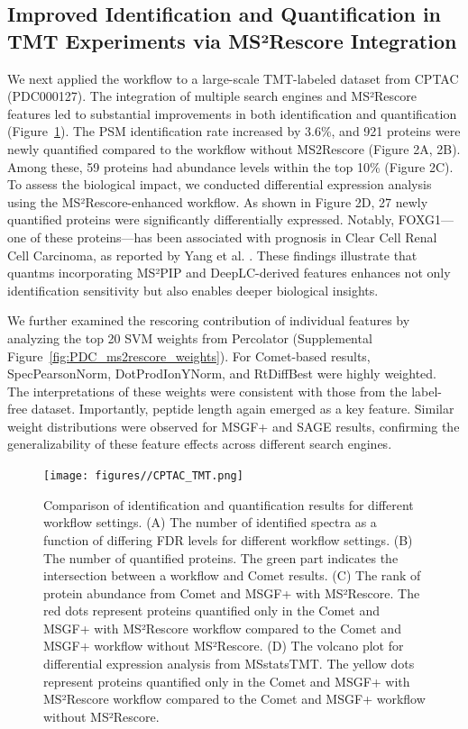 \documentclass[12pt]{article}
\begin{document}
\subsection{Improved Identification and Quantification in TMT Experiments via MS²Rescore Integration}
We next applied the workflow to a large-scale TMT-labeled dataset from CPTAC (PDC000127). The integration of multiple search engines and MS²Rescore features led to substantial improvements in both identification and quantification (Figure~\ref{fig:PDC_ms2rescore}). The PSM identification rate increased by 3.6\%, and 921 proteins were newly quantified compared to the workflow without MS2Rescore (Figure 2A, 2B). Among these, 59 proteins had abundance levels within the top 10\% (Figure 2C). To assess the biological impact, we conducted differential expression analysis using the MS²Rescore-enhanced workflow. As shown in Figure 2D, 27 newly quantified proteins were significantly differentially expressed. Notably, FOXG1—one of these proteins—has been associated with prognosis in Clear Cell Renal Cell Carcinoma, as reported by Yang et al. \cite{yang_comprehensive_2022}. These findings illustrate that quantms incorporating MS²PIP and DeepLC-derived features enhances not only identification sensitivity but also enables deeper biological insights.

We further examined the rescoring contribution of individual features by analyzing the top 20 SVM weights from Percolator (Supplemental Figure~\ref{fig:PDC_ms2rescore_weights}). For Comet-based results, SpecPearsonNorm, DotProdIonYNorm, and RtDiffBest were highly weighted. The interpretations of these weights were consistent with those from the label-free dataset. Importantly, peptide length again emerged as a key feature. Similar weight distributions were observed for MSGF+ and SAGE results, confirming the generalizability of these feature effects across different search engines.

\begin{figure}[ht!]
	\centering
	\texttt{[image: figures//CPTAC\_TMT.png]}
	\caption{Comparison of identification and quantification results for different workflow settings. (A) The number of identified spectra as a function of differing FDR levels for different workflow settings. (B) The number of quantified proteins. The green part indicates the intersection between a workflow and Comet results. (C) The rank of protein abundance from Comet and MSGF+ with MS²Rescore. The red dots represent proteins quantified only in the Comet and MSGF+ with MS²Rescore workflow compared to the Comet and MSGF+ workflow without MS²Rescore. (D) The volcano plot for differential expression analysis from MSstatsTMT. The yellow dots represent proteins quantified only in the Comet and MSGF+ with MS²Rescore workflow compared to the Comet and MSGF+ workflow without MS²Rescore.}
	\label{fig:PDC_ms2rescore}
\end{figure}
\end{document}
